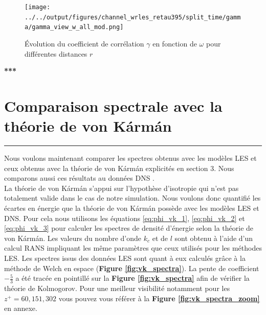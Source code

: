 \documentclass[12pt]{article}   %
\theoremstyle{plain}
\theoremstyle{remark}
\begin{document}
\begin{figure}[H]
	\begin{center}
		\texttt{[image: ../../output/figures/channel\_wrles\_retau395/split\_time/gamma/gamma\_view\_w\_all\_mod.png]}
		\caption{Évolution du coefficient de corrélation $\gamma$ en fonction de $\omega$ pour différentes distances $r$}
		\label{fig:gamma_w_view}
	\end{center}
\end{figure}


\begin{center}
	\large \bf{***}
\end{center}




\vspace{0.3cm}
\section{Comparaison spectrale avec la théorie de von Kármán}
\noindent\rule{\linewidth}{2pt}
\vspace{0.1cm}

Nous voulons maintenant comparer les spectres obtenus avec les modèles LES et ceux obtenus avec la théorie de von Kármán explicités en section 3. Nous comparons aussi ces résultats au données DNS \cite{lee2015direct}. \\
La théorie de von Kármán s'appui sur l'hypothèse d'isotropie qui n'est pas totalement valide dans le cas de notre simulation. Nous voulons donc quantifié les écartes en énergie que la théorie de von Kármán possède avec les modèles LES et DNS. Pour cela nous utilisons les équations \ref{eq:phi_vk_1}, \ref{eq:phi_vk_2} et \ref{eq:phi_vk_3} pour calculer les spectres de densité d'énergie selon la théorie de von Kármán. Les valeurs du nombre d'onde $k_c$ et de $l$ sont obtenu à l'aide d'un calcul RANS impliquant les même paramètres que ceux utilisés pour les méthodes LES. Les spectres issus des données LES sont quant à eux calculés grâce à la méthode de Welch en espace ({\bf Figure \ref{fig:vk_spectra}}). La pente de coefficient $-\frac{5}{3}$ a été tracée en pointillé sur la \textbf{Figure \ref{fig:vk_spectra}} afin de vérifier la théorie de Kolmogorov. Pour une meilleur visibilité notamment pour les $z^+=60, 151, 302$ vous pouvez vous référer à la \textbf{Figure \ref{fig:vk_spectra_zoom}} en annexe. \\
\end{document}
